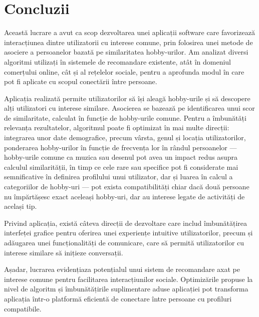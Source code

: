 \chapter{Concluzii}
\label{conclusions}

Această lucrare a avut ca scop dezvoltarea unei aplicații software care favorizează interacțiunea dintre utilizatorii cu interese comune, prin folosirea unei metode de asociere a persoanelor bazată pe similaritatea hobby-urilor.
Am analizat diversi algoritmi utilizați în sistemele de recomandare existente, atât în domeniul comerțului online, cât și al rețelelor sociale, pentru a aprofunda modul în care pot fi aplicate cu scopul conectării între persoane.
\par
Aplicația realizată permite utilizatorilor să își aleagă hobby-urile și să descopere alți utilizatori cu interese similare.
Asocierea se bazează pe identificarea unui scor de similaritate, calculat în funcție de hobby-urile comune.
Pentru a îmbunătăți relevanța rezultatelor, algoritmul poate fi optimizat în mai multe direcții: integrarea unor date demografice, precum vârsta, genul și locația utilizatorilor, ponderarea hobby-urilor în funcție de frecvența lor în rândul persoanelor --- hobby-urile comune ca muzica sau desenul pot avea un impact redus asupra calculul similarității, în timp ce cele rare sau specifice pot fi considerate mai semnificative în definirea profilului unui utilizator, dar și luarea în calcul a categoriilor de hobby-uri --- pot exista compatibilități chiar dacă două persoane nu împărtășesc exact aceleași hobby-uri, dar au interese legate de activități de același tip.
\par
Privind aplicația, există câteva direcții de dezvoltare care includ îmbunătățirea interfeței grafice pentru oferirea unei experiențe intuitive utilizatorilor, precum și adăugarea unei funcționalități de comunicare, care să permită utilizatorilor cu interese similare să inițieze conversații.
\par
Așadar, lucrarea evidențiaza potențialul unui sistem de recomandare axat pe interese comune pentru facilitarea interacțiunilor sociale. 
Optimizările propuse la nivel de algoritm și îmbunătățirile suplimentare aduse aplicației pot transforma aplicația într-o platformă eficientă de conectare între persoane cu profiluri compatibile.
